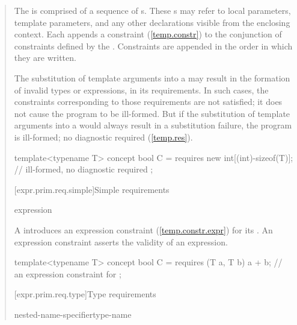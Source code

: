 \begin{quote}
\pnum
The  is comprised of 
a sequence of s.
%
These s may refer to local 
parameters, template parameters, and any other declarations visible from the 
enclosing context. 
%
Each  appends a constraint (\ref{temp.constr}) to 
the conjunction of constraints defined by the
. Constraints are appended in the order
in which they are written.

\pnum
The substitution of template arguments into a  
may result in the formation of  invalid types or expressions, in its
requirements. In such cases, the constraints corresponding to those
requirements are not satisfied; it does not cause the program to be ill-formed.
%
\enternote
But if the substitution of template arguments into
a  would always result in
a substitution failure, the program is ill-formed; no diagnostic
required (\ref{temp.res}).
\exitnote
%
\enterexample
\begin{codeblock}
template<typename T> concept bool C =
  requires {
    new int[(int)-sizeof(T)]; // ill-formed, no diagnostic required
  };
\end{codeblock}
\exitexample


[expr.prim.req.simple]{Simple requirements}

\begin{bnf}
    expression \terminal{;}
\end{bnf}

\pnum
A  introduces an expression 
constraint (\ref{temp.constr.expr}) for its 
.
\enternote
An expression constraint asserts the validity of an expression.
\exitnote

\enterexample
\begin{codeblock}
template<typename T> concept bool C =
  requires (T a, T b) {
    a + b;  // an expression constraint for 
  };
\end{codeblock}
\exitexample


[expr.prim.req.type]{Type requirements}

\begin{bnf}
\br
     nested-name-specifier\opt type-name \terminal{;}
\end{bnf}


\end{quote}
